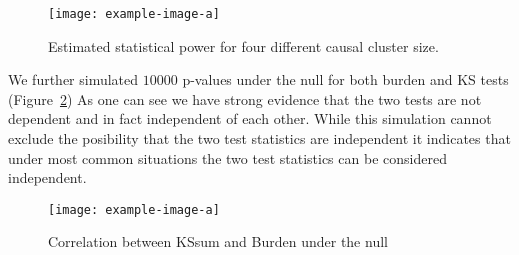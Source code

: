 \begin{figure}[ht!]
	\centering
	\texttt{[image: example-image-a]}
	\caption{Estimated statistical power for four different causal cluster size.\label{fig:simulatedGeneRealData}}
\end{figure}

We further simulated $10000$ p-values under the null for both burden and KS tests (Figure~\ref{fig:nullCor})
As one can see we have strong evidence that the two tests are not dependent and in fact independent of each other.
While this simulation cannot exclude the posibility that the two test statistics are independent it indicates that under most common situations the two test statistics can be considered independent.

\begin{figure}[ht!]
	\centering
	\texttt{[image: example-image-a]}
	\caption{\label{fig:nullCor} Correlation between KSsum and Burden under the null}
\end{figure}
